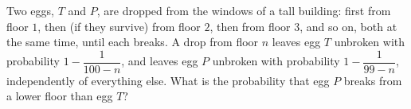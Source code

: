 Two eggs, $T$ and $P$, are dropped from the windows of a tall building: first from floor $1$, then (if they survive) from floor $2$, then from floor $3$, and so on, both at the same time, until each breaks. A drop from floor $n$ leaves egg $T$ unbroken with probability $1-\dfrac{1}{100-n}$, and leaves egg $P$ unbroken with probability $1-\dfrac{1}{99-n}$, independently of everything else. What is the probability that egg $P$ breaks from a lower floor than egg $T$?
